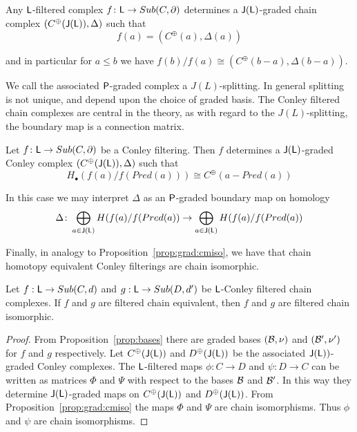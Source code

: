 \begin{cor}
\label{prop:Lsplitting}
Any ${\mathsf L}$-filtered complex $f\colon {\mathsf L}\to Sub(C,\partial)$ determines a ${\mathsf J}({\mathsf L})$-graded chain complex $(C^\oplus({\mathsf J}({\mathsf L})),\Delta)$  such that $$f(a)= (C^\oplus(a),\Delta(a))$$

and in particular for $a\leq b$ we have $f(b)/f(a) \cong (C^\oplus(b-a),\Delta(b-a))$.

\end{cor}

We call the associated ${\mathsf P}$-graded complex a $J(L)$-splitting.  In general splitting is not unique, and depend upon the choice of graded basis.   The Conley filtered chain complexes are central in the theory, as with regard to the $J(L)$-splitting, the boundary map is a connection matrix.

\begin{cor}
Let $f\colon {\mathsf L} \to Sub(C,\partial)$  be a Conley filtering. Then $f$ determines a ${\mathsf J}({\mathsf L})$-graded Conley complex $(C^\oplus({\mathsf J}({\mathsf L})),\Delta)$ such that
\[
H_\bullet(f(a)/f(Pred(a))) \cong C^\oplus(a-Pred(a))
\]
\end{cor}

In this case we may interpret $\Delta$ as an ${\mathsf P}$-graded boundary map on homology
\[
\Delta \colon \bigoplus_{a\in {\mathsf J}({\mathsf L})} H(f(a)/f(Pred(a)) \to \bigoplus_{a\in {\mathsf J}({\mathsf L})} H(f(a)/f(Pred(a))
\]


Finally, in analogy to Proposition~\ref{prop:grad:cmiso}, we have that chain homotopy equivalent Conley filterings are chain isomorphic.

 \begin{prop}\label{prop:filt:cmiso}
 Let $f:{\mathsf L}\to Sub(C,d)$ and $g:{\mathsf L}\to Sub(D,d')$ be ${\mathsf L}$-Conley filtered chain complexes.  If $f$ and $g$ are filtered chain equivalent, then $f$ and $g$ are filtered chain isomorphic.
 
 \end{prop}
 \begin{proof}
From Proposition~\ref{prop:bases} there are graded bases $({\mathcal B},\nu)$ and $({\mathcal B}',\nu')$ for $f$ and $g$ respectively.  Let $C^\oplus({\mathsf J}({\mathsf L}))$ and $D^\oplus({\mathsf J}({\mathsf L}))$ be the associated ${\mathsf J}({\mathsf L}))$-graded Conley complexes.  The ${\mathsf L}$-filtered maps $\phi:C\to D$ and $\psi:D\to C$ can be written as matrices $\Phi$ and $\Psi$ with respect to the bases ${\mathcal B}$ and ${\mathcal B}'$.  In this way they determine ${\mathsf J}({\mathsf L})$-graded maps on $C^\oplus({\mathsf J}({\mathsf L}))$ and $D^\oplus({\mathsf J}({\mathsf L}))$.  From Proposition~\ref{prop:grad:cmiso} the maps $\Phi$ and $\Psi$ are chain isomorphisms.  Thus $\phi$ and $\psi$ are chain isomorphisms.
  \end{proof}

